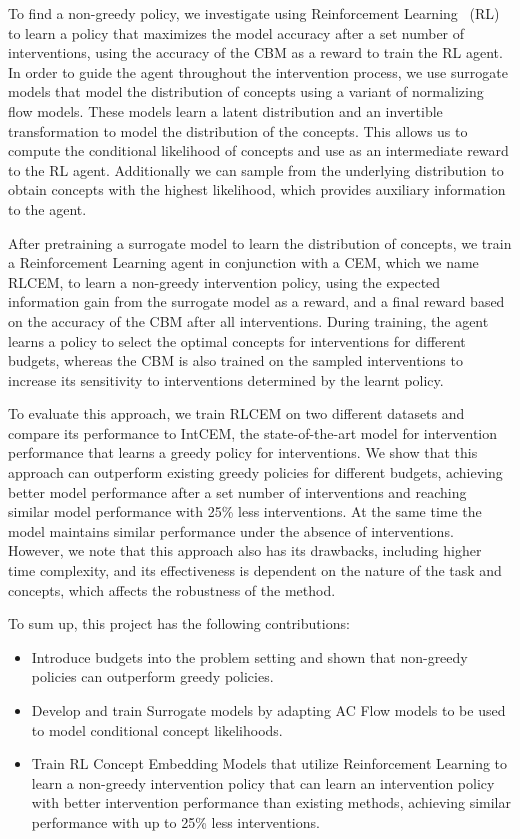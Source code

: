 To find a non-greedy policy, we investigate using Reinforcement Learning~\cite{rl} (RL) 
to learn a policy that maximizes
the model accuracy after a set number of interventions,
using the accuracy of the CBM as a reward to train the RL agent.
In order
to guide the agent throughout the intervention process,
we use surrogate models that model the distribution of concepts using
a variant of normalizing flow models. These models learn a latent distribution
and an invertible transformation to model the distribution of the concepts.
This allows us to compute the conditional likelihood of concepts 
and use as an intermediate reward to the RL agent. Additionally we can sample
from the underlying distribution to obtain concepts with the highest likelihood,
which provides auxiliary information to the agent.

After pretraining a surrogate model to learn the distribution of concepts,
we train a Reinforcement Learning agent in conjunction with a CEM, which we name RLCEM, to learn a 
non-greedy intervention policy, using
the expected information gain from the surrogate model
as a reward, and a final reward based on the 
accuracy of the CBM after all interventions.
During training,
the agent learns a policy to select
the optimal concepts for interventions for different budgets,
whereas the CBM is also trained on the sampled interventions
to increase its sensitivity to interventions determined by 
the learnt policy.

To evaluate this approach, we train RLCEM on two different datasets
and compare its performance to IntCEM, the state-of-the-art 
model for intervention performance that learns a greedy policy 
for interventions.
We show that this approach can outperform existing greedy policies
for different budgets, achieving better model performance
after a set number of interventions and reaching similar
model performance with 25\% less interventions. 
At the same time the model maintains similar performance under 
the absence of interventions. However, we note that
this approach also has its drawbacks, including
higher time complexity, and its effectiveness is dependent on 
the nature of the task and concepts, which affects the robustness of the method.

To sum up, this project has the following contributions:
\begin{itemize}
    \item Introduce budgets into the problem setting and shown that non-greedy policies can outperform greedy policies.
    \item Develop and train Surrogate models by adapting AC Flow models to be used to model conditional concept likelihoods.
    \item Train RL Concept Embedding Models that utilize Reinforcement Learning
    to learn a non-greedy intervention policy that can learn an intervention policy
    with better intervention performance than existing methods, achieving similar performance
    with up to 25\% less interventions.
\end{itemize}

